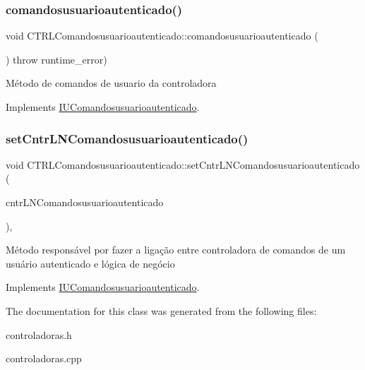 \subsubsection{\texorpdfstring{comandosusuarioautenticado()}{comandosusuarioautenticado()}}
{\footnotesize\ttfamily void C\+T\+R\+L\+Comandosusuarioautenticado\+::comandosusuarioautenticado (\begin{DoxyParamCaption}{ }\end{DoxyParamCaption}) throw  runtime\+\_\+error) \hspace{0.3cm}{\ttfamily [virtual]}}

Método de comandos de usuario da controladora 

Implements \hyperlink{classIUComandosusuarioautenticado}{I\+U\+Comandosusuarioautenticado}.

\mbox{\label{classCTRLComandosusuarioautenticado_a921e8dec09b5861ea96b737b673ab785}} 
\subsubsection{\texorpdfstring{set\+Cntr\+L\+N\+Comandosusuarioautenticado()}{setCntrLNComandosusuarioautenticado()}}
{\footnotesize\ttfamily void C\+T\+R\+L\+Comandosusuarioautenticado\+::set\+Cntr\+L\+N\+Comandosusuarioautenticado (\begin{DoxyParamCaption}\item[{\hyperlink{classILNComandosusuarioautenticado}{I\+L\+N\+Comandosusuarioautenticado} $\ast$}]{cntr\+L\+N\+Comandosusuarioautenticado }\end{DoxyParamCaption})\hspace{0.3cm}{\ttfamily [inline]}, {\ttfamily [virtual]}}

Método responsável por fazer a ligação entre controladora de comandos de um usuário autenticado e lógica de negócio 

Implements \hyperlink{classIUComandosusuarioautenticado}{I\+U\+Comandosusuarioautenticado}.



The documentation for this class was generated from the following files\+:\begin{DoxyCompactItemize}
\item 
controladoras.\+h\item 
controladoras.\+cpp\end{DoxyCompactItemize}
